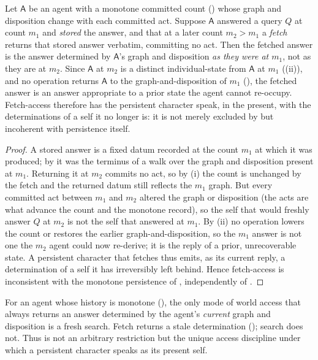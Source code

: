 \documentclass[11pt,twocolumn,a4paper]{article}
\newcommand{\Agent}{\mathsf{A}}
\newcommand{\cnt}{m}                 %
\begin{document}
\begin{proposition}
\label{prop:fetch-incoherent}
Let $\Agent$ be an agent with a monotone committed count
() whose graph and disposition change with each committed
act. Suppose $\Agent$ answered a query $Q$ at count $\cnt_1$ and \emph{stored}
the answer, and that at a later count $\cnt_2>\cnt_1$ a \emph{fetch}
returns that stored answer verbatim, committing no act. Then the fetched
answer is the answer determined by $\Agent$'s graph and disposition
\emph{as they were at $\cnt_1$}, not as they are at $\cnt_2$. Since
$\Agent$ at $\cnt_2$ is a distinct individual-state from $\Agent$ at
$\cnt_1$ ((ii)), and no operation returns $\Agent$ to the
graph-and-disposition of $\cnt_1$ (), the fetched answer
is an answer appropriate to a prior state the agent cannot re-occupy.
Fetch-access therefore has the persistent character speak, in the present,
with the determinations of a self it no longer is: it is not merely
excluded by  but incoherent with persistence itself.
\end{proposition}

\begin{proof}
A stored answer is a fixed datum recorded at the count $\cnt_1$ at which it
was produced; by  it was the terminus of a walk over the
graph and disposition present at $\cnt_1$. Returning it at $\cnt_2$
commits no act, so by (i) the count is unchanged by the
fetch and the returned datum still reflects the $\cnt_1$ graph. But every
committed act between $\cnt_1$ and $\cnt_2$ altered the graph or
disposition (the acts are what advance the count and the monotone record),
so the self that would freshly answer $Q$ at $\cnt_2$ is not the self that
answered at $\cnt_1$. By (ii) no operation lowers the
count or restores the earlier graph-and-disposition, so the $\cnt_1$ answer
is not one the $\cnt_2$ agent could now re-derive; it is the reply of a
prior, unrecoverable state. A persistent character that fetches thus
emits, as its current reply, a determination of a self it has irreversibly
left behind. Hence fetch-access is inconsistent with the monotone
persistence of , independently of .
\end{proof}

\begin{corollary}
\label{cor:search-forced}
For an agent whose history is monotone (), the only mode
of world access that always returns an answer determined by the agent's
\emph{current} graph and disposition is a fresh search. Fetch returns a
stale determination (); search does not. Thus
 is not an arbitrary restriction but the unique access
discipline under which a persistent character speaks as its present self.
\end{corollary}
\end{document}
